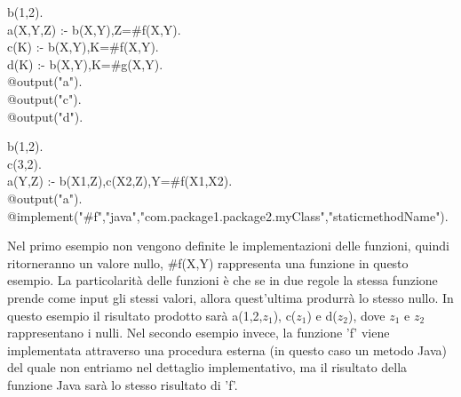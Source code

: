\begin{algorithm}[h]
	b(1,2). \\
	a(X,Y,Z) :- b(X,Y),Z=\#f(X,Y). \\
	c(K) :- b(X,Y),K=\#f(X,Y). \\
	d(K) :- b(X,Y),K=\#g(X,Y). \\
	@output("a"). \\
	@output("c"). \\
	@output("d"). \\
\end{algorithm}

\begin{algorithm}[h]
	b(1,2). \\
	c(3,2). \\
	a(Y,Z) :- b(X1,Z),c(X2,Z),Y=\#f(X1,X2). \\
	@output("a"). \\
	@implement("\#f","java","com.package1.package2.myClass","staticmethodName").
\end{algorithm}

Nel primo esempio non vengono definite le implementazioni delle funzioni, quindi ritorneranno un valore nullo, \#f(X,Y) rappresenta una funzione in questo esempio. La particolarità delle funzioni è che se in due regole la stessa funzione prende come input gli stessi valori, allora quest'ultima produrrà lo stesso nullo. In questo esempio il risultato prodotto sarà a(1,2,$z_{1}$), c($z_{1}$) e d($z_{2}$), dove $z_{1}$ e $z_{2}$ rappresentano i nulli. 
Nel secondo esempio invece, la funzione 'f' viene implementata attraverso una procedura esterna (in questo caso un metodo Java) del quale non entriamo nel dettaglio implementativo, ma il risultato della funzione Java sarà lo stesso risultato di 'f'.